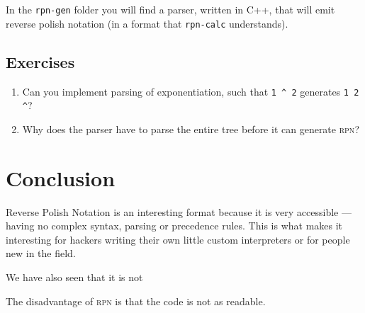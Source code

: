 \documentclass[a4paper,twocolumn]{article}
\begin{document}
In the \verb|rpn-gen| folder you will find a parser, written in C++, that will emit reverse polish notation (in a format that \verb|rpn-calc| understands). 

\subsection*{Exercises}

\begin{enumerate}
  \item Can you implement parsing of exponentiation, such that \verb|1 ^ 2| generates \verb|1 2 ^|?
  \item Why does the parser have to parse the entire tree before it can generate \textsc{rpn}?
\end{enumerate}

\section{Conclusion}

Reverse Polish Notation is an interesting format because it is very accessible — having no complex syntax, parsing or precedence rules. This is what makes it interesting for hackers writing their own little custom interpreters or for people new in the field.

We have also seen that it is not 

The disadvantage of \textsc{rpn} is that the code is not as readable.

\printbibliography
\end{document}
